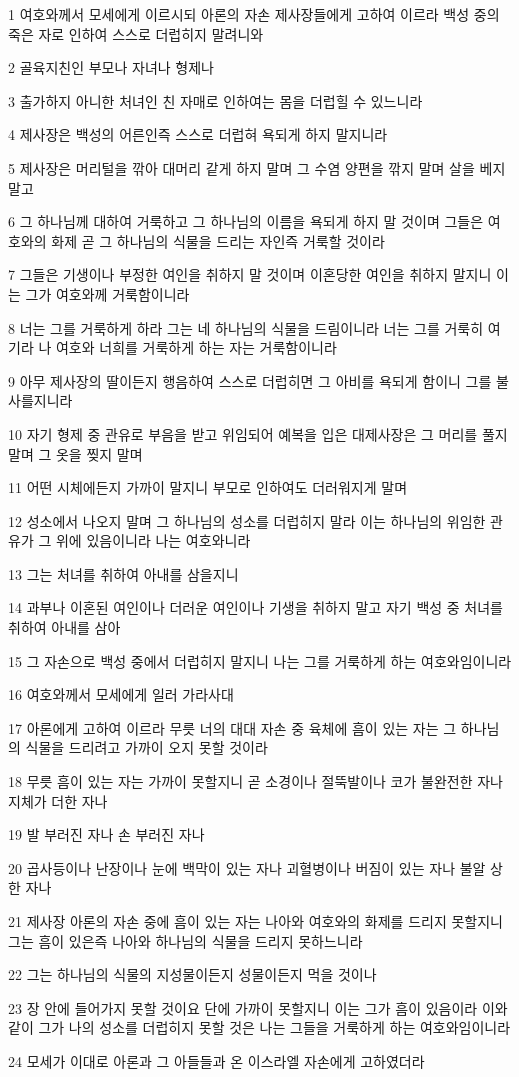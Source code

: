 \par 1 여호와께서 모세에게 이르시되 아론의 자손 제사장들에게 고하여 이르라 백성 중의 죽은 자로 인하여 스스로 더럽히지 말려니와
\par 2 골육지친인 부모나 자녀나 형제나
\par 3 출가하지 아니한 처녀인 친 자매로 인하여는 몸을 더럽힐 수 있느니라
\par 4 제사장은 백성의 어른인즉 스스로 더럽혀 욕되게 하지 말지니라
\par 5 제사장은 머리털을 깎아 대머리 같게 하지 말며 그 수염 양편을 깎지 말며 살을 베지 말고
\par 6 그 하나님께 대하여 거룩하고 그 하나님의 이름을 욕되게 하지 말 것이며 그들은 여호와의 화제 곧 그 하나님의 식물을 드리는 자인즉 거룩할 것이라
\par 7 그들은 기생이나 부정한 여인을 취하지 말 것이며 이혼당한 여인을 취하지 말지니 이는 그가 여호와께 거룩함이니라
\par 8 너는 그를 거룩하게 하라 그는 네 하나님의 식물을 드림이니라 너는 그를 거룩히 여기라 나 여호와 너희를 거룩하게 하는 자는 거룩함이니라
\par 9 아무 제사장의 딸이든지 행음하여 스스로 더럽히면 그 아비를 욕되게 함이니 그를 불사를지니라
\par 10 자기 형제 중 관유로 부음을 받고 위임되어 예복을 입은 대제사장은 그 머리를 풀지 말며 그 옷을 찢지 말며
\par 11 어떤 시체에든지 가까이 말지니 부모로 인하여도 더러워지게 말며
\par 12 성소에서 나오지 말며 그 하나님의 성소를 더럽히지 말라 이는 하나님의 위임한 관유가 그 위에 있음이니라 나는 여호와니라
\par 13 그는 처녀를 취하여 아내를 삼을지니
\par 14 과부나 이혼된 여인이나 더러운 여인이나 기생을 취하지 말고 자기 백성 중 처녀를 취하여 아내를 삼아
\par 15 그 자손으로 백성 중에서 더럽히지 말지니 나는 그를 거룩하게 하는 여호와임이니라
\par 16 여호와께서 모세에게 일러 가라사대
\par 17 아론에게 고하여 이르라 무릇 너의 대대 자손 중 육체에 흠이 있는 자는 그 하나님의 식물을 드리려고 가까이 오지 못할 것이라
\par 18 무릇 흠이 있는 자는 가까이 못할지니 곧 소경이나 절뚝발이나 코가 불완전한 자나 지체가 더한 자나
\par 19 발 부러진 자나 손 부러진 자나
\par 20 곱사등이나 난장이나 눈에 백막이 있는 자나 괴혈병이나 버짐이 있는 자나 불알 상한 자나
\par 21 제사장 아론의 자손 중에 흠이 있는 자는 나아와 여호와의 화제를 드리지 못할지니 그는 흠이 있은즉 나아와 하나님의 식물을 드리지 못하느니라
\par 22 그는 하나님의 식물의 지성물이든지 성물이든지 먹을 것이나
\par 23 장 안에 들어가지 못할 것이요 단에 가까이 못할지니 이는 그가 흠이 있음이라 이와 같이 그가 나의 성소를 더럽히지 못할 것은 나는 그들을 거룩하게 하는 여호와임이니라
\par 24 모세가 이대로 아론과 그 아들들과 온 이스라엘 자손에게 고하였더라

